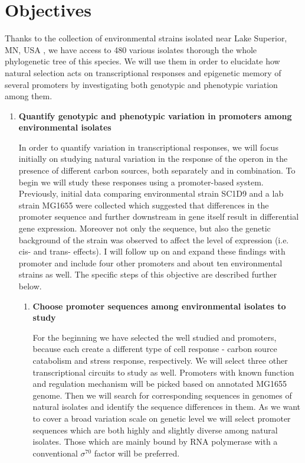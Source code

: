 \chapter*{Objectives}

\shorthandoff{-} 

Thanks to the collection of environmental  strains isolated near Lake Superior, MN, USA \cite{ishii2006presence}, we have access to 480 various isolates thorough the whole phylogenetic tree of this species.
We will use them in order to elucidate how natural selection acts on transcriptional responses and epigenetic memory of several promoters by investigating both genotypic and phenotypic variation among them.

\begin{enumerate}[font=\bfseries]

	\item \textbf{Quantify genotypic and phenotypic variation in promoters among environmental  isolates}
	
	In order to quantify variation in transcriptional responses, we will focus initially on studying natural variation in the response of the  operon in the presence of different carbon sources, both separately and in combination.
	To begin we will study these responses using a promoter-based system.
	Previously, initial data comparing environmental strain SC1\textunderscore D9 and a lab strain MG1655 were collected which suggested that differences in the  promoter sequence and further downstream in  gene itself result in differential gene expression.
	Moreover not only the sequence, but also the genetic background of the strain was observed to affect the level of expression (i.e. cis- and trans- effects).
	I will follow up on and expand these findings with  promoter and include four other promoters and about ten environmental  strains as well.
	The specific steps of this objective are described further below.

	\begin{enumerate}[font=\bfseries]
	
		\item \textbf{Choose promoter sequences among environmental  isolates to study}
		
		For the beginning we have selected the well studied  and  promoters, because each create a different type of cell response - carbon source catabolism and stress response, respectively.
		We will select three other transcriptional circuits to study as well.
		Promoters with known function and regulation mechanism will be picked based on annotated MG1655 genome.
		Then we will search for corresponding sequences in genomes of natural isolates and identify the sequence differences in them.
		As we want to cover a broad variation scale on genetic level we will select promoter sequences which are both highly and slightly diverse among natural isolates.
		Those which are mainly bound by RNA polymerase with a conventional $\sigma^{70}$ factor will be preferred.


\end{enumerate}
\end{enumerate}
